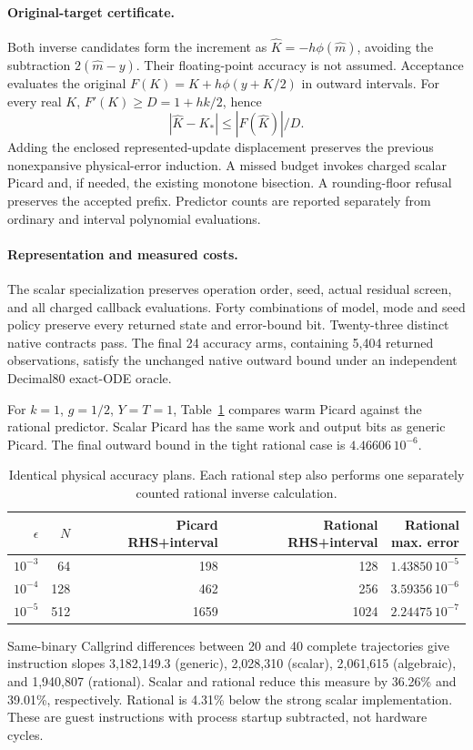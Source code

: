 \paragraph{Original-target certificate.}
Both inverse candidates form the increment as $\widehat K=-h\phi(\widehat m)$,
avoiding the subtraction $2(\widehat m-y)$.  Their floating-point accuracy is
not assumed.  Acceptance evaluates the original
$F(K)=K+h\phi(y+K/2)$ in outward intervals.  For every real $K$,
$F'(K)\geq D=1+hk/2$, hence
\begin{equation}
 |\widehat K-K_*|\leq |F(\widehat K)|/D.
\end{equation}
Adding the enclosed represented-update displacement preserves the previous
nonexpansive physical-error induction.  A missed budget invokes charged scalar
Picard and, if needed, the existing monotone bisection.  A rounding-floor
refusal preserves the accepted prefix.  Predictor counts are reported
separately from ordinary and interval polynomial evaluations.

\paragraph{Representation and measured costs.}
The scalar specialization preserves operation order, seed, actual residual
screen, and all charged callback evaluations.  Forty combinations of model,
mode and seed policy preserve every returned state and error-bound bit.
Twenty-three distinct native contracts pass.  The final 24 accuracy arms,
containing 5,404 returned observations, satisfy the unchanged native outward
bound under an independent Decimal80 exact-ODE oracle.

For $k=1$, $g=1/2$, $Y=T=1$, Table~\ref{tab:production-cubic-work} compares
warm Picard against the rational predictor.  Scalar Picard has the same
work and output bits as generic Picard. The final outward bound in the
tight rational case is $4.46606\,10^{-6}$.
\begin{table}[ht]
\caption{Identical physical accuracy plans.  Each rational step also performs
one separately counted rational inverse calculation.}
\label{tab:production-cubic-work}
\begin{ruledtabular}
\begin{tabular}{rrrrr}
$\epsilon$ & $N$ & Picard RHS+interval & Rational RHS+interval & \shortstack{Rational\\max. error}\\
\hline
$10^{-3}$&64&198&128&$1.43850\,10^{-5}$\\
$10^{-4}$&128&462&256&$3.59356\,10^{-6}$\\
$10^{-5}$&512&1659&1024&$2.24475\,10^{-7}$
\end{tabular}
\end{ruledtabular}
\end{table}
Same-binary Callgrind differences between 20 and 40 complete trajectories
give instruction slopes 3,182,149.3 (generic), 2,028,310 (scalar),
2,061,615 (algebraic), and 1,940,807 (rational).  Scalar and rational reduce
this measure by 36.26\% and 39.01\%, respectively.  Rational is 4.31\% below
the strong scalar implementation.  These are guest instructions with process
startup subtracted, not hardware cycles.

